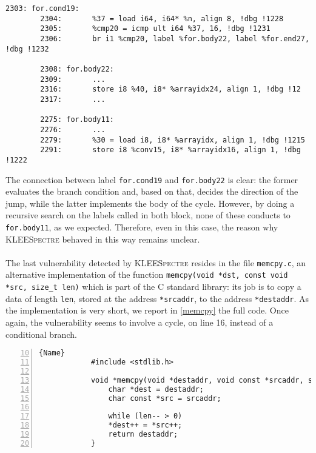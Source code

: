 \documentclass[target=mst,aauheader=aics]{thud}
\theoremstyle{definition}
\begin{document}
	\lstset{
		numbers=none
	}
	\begin{lstlisting}[caption=\texttt{assembly.ll}]
		2303: for.cond19:                
		2304: 		%37 = load i64, i64* %n, align 8, !dbg !1228
		2305:		%cmp20 = icmp ult i64 %37, 16, !dbg !1231                       
		2306: 		br i1 %cmp20, label %for.body22, label %for.end27, !dbg !1232
		
		2308: for.body22: 
		2309:		...
		2316:		store i8 %40, i8* %arrayidx24, align 1, !dbg !12
		2317:		...
		
		2275: for.body11: 
		2276:		...
		2279: 		%30 = load i8, i8* %arrayidx, align 1, !dbg !1215
		2291: 		store i8 %conv15, i8* %arrayidx16, align 1, !dbg !1222
	\end{lstlisting}
	\vspace{3mm}
	
	The connection between label \texttt{for.cond19} and \texttt{for.body22} is clear: the former evaluates the branch condition and, based on that, decides the direction of the jump, while the latter implements the body of the cycle. However, by doing a recursive search on the labels called in both block, none of these conducts to \texttt{for.body11}, as we expected. Therefore, even in this case, the reason why \textsc{KLEESpectre} behaved in this way remains unclear.
	\paragraph{}The last vulnerability detected by \textsc{KLEESpectre} resides in the file \texttt{memcpy.c}, an alternative implementation of the function \texttt{memcpy(void *dst, const void *src, size\_t len)} which is part of the C standard library: its job is to copy a data of length \texttt{len}, stored at the address \texttt{*srcaddr}, to the address \texttt{*destaddr}. As the implementation is very short, we report in \ref{memcpy} the full code. Once again, the vulnerability seems to involve a cycle, on line 16, instead of a conditional branch.
	
	\begin{minipage}{.9\textwidth}
		\begin{lstlisting}[caption=\texttt{memcpy.c}, firstnumber=10, label=memcpy,numbers=left]{Name}
			#include <stdlib.h>
			
			void *memcpy(void *destaddr, void const *srcaddr, size_t len) {
				char *dest = destaddr;
				char const *src = srcaddr;
				
				while (len-- > 0)
				*dest++ = *src++;
				return destaddr;
			}
		\end{lstlisting}
	\end{minipage}	
	\vspace{3mm}
	
\end{document}
